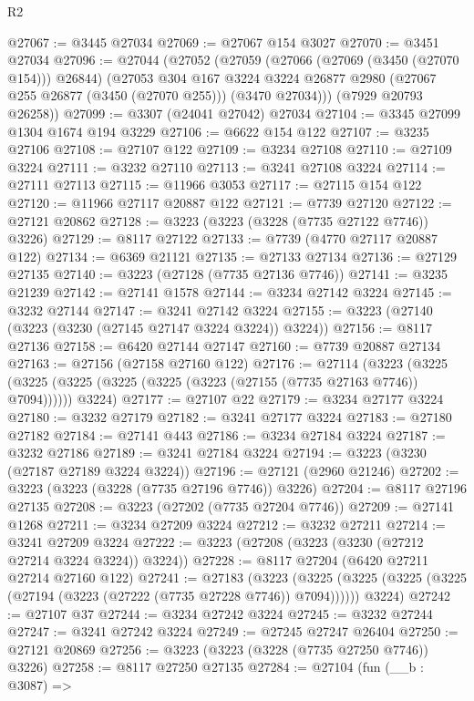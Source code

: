 \begin{lexlean}{R2}
\begin{coremodule}
@27067 := @3445 @27034
@27069 := @27067 @154 @3027
@27070 := @3451 @27034
@27096 := @27044
    (@27052
      (@27059
        (@27066 (@27069 (@3450 (@27070 @154))) @26844)
        (@27053
          @304
          @167
          @3224
          @3224
          @26877
          @2980
          (@27067 @255 @26877 (@3450 (@27070 @255)))
          (@3470 @27034)))
      (@7929 @20793 @26258))
@27099 := @3307 (@24041 @27042) @27034
@27104 := @3345 @27099 @1304 @1674 @194 @3229
@27106 := @6622 @154 @122
@27107 := @3235 @27106
@27108 := @27107 @122
@27109 := @3234 @27108
@27110 := @27109 @3224
@27111 := @3232 @27110
@27113 := @3241 @27108 @3224
@27114 := @27111 @27113
@27115 := @11966 @3053
@27117 := @27115 @154 @122
@27120 := @11966 @27117 @20887 @122
@27121 := @7739 @27120
@27122 := @27121 @20862
@27128 := @3223 (@3223 (@3228 (@7735 @27122 @7746)) @3226)
@27129 := @8117 @27122
@27133 := @7739 (@4770 @27117 @20887 @122)
@27134 := @6369 @21121
@27135 := @27133 @27134
@27136 := @27129 @27135
@27140 := @3223 (@27128 (@7735 @27136 @7746))
@27141 := @3235 @21239
@27142 := @27141 @1578
@27144 := @3234 @27142 @3224
@27145 := @3232 @27144
@27147 := @3241 @27142 @3224
@27155 := @3223 (@27140 (@3223 (@3230 (@27145 @27147 @3224 @3224)) @3224))
@27156 := @8117 @27136
@27158 := @6420 @27144 @27147
@27160 := @7739 @20887 @27134
@27163 := @27156 (@27158 @27160 @122)
@27176 := @27114
    (@3223
      (@3225 (@3225 (@3225 (@3225 (@3225 (@3223 (@27155 (@7735 @27163 @7746)) @7094))))))
      @3224)
@27177 := @27107 @22
@27179 := @3234 @27177 @3224
@27180 := @3232 @27179
@27182 := @3241 @27177 @3224
@27183 := @27180 @27182
@27184 := @27141 @443
@27186 := @3234 @27184 @3224
@27187 := @3232 @27186
@27189 := @3241 @27184 @3224
@27194 := @3223 (@3230 (@27187 @27189 @3224 @3224))
@27196 := @27121 (@2960 @21246)
@27202 := @3223 (@3223 (@3228 (@7735 @27196 @7746)) @3226)
@27204 := @8117 @27196 @27135
@27208 := @3223 (@27202 (@7735 @27204 @7746))
@27209 := @27141 @1268
@27211 := @3234 @27209 @3224
@27212 := @3232 @27211
@27214 := @3241 @27209 @3224
@27222 := @3223 (@27208 (@3223 (@3230 (@27212 @27214 @3224 @3224)) @3224))
@27228 := @8117 @27204 (@6420 @27211 @27214 @27160 @122)
@27241 := @27183
    (@3223
      (@3225 (@3225 (@3225 (@3225 (@27194 (@3223 (@27222 (@7735 @27228 @7746)) @7094))))))
      @3224)
@27242 := @27107 @37
@27244 := @3234 @27242 @3224
@27245 := @3232 @27244
@27247 := @3241 @27242 @3224
@27249 := @27245 @27247 @26404
@27250 := @27121 @20869
@27256 := @3223 (@3223 (@3228 (@7735 @27250 @7746)) @3226)
@27258 := @8117 @27250 @27135
@27284 := @27104
    (fun (__b : @3087) =>

\end{coremodule}
\end{lexlean}
